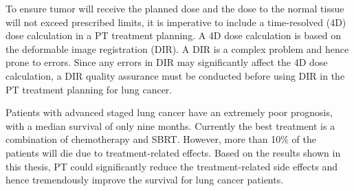 To ensure tumor will receive the planned dose and the dose to the normal tissue will not exceed prescribed limits, it is imperative
to include a time-resolved (4D) dose calculation in a PT treatment planning. A 4D dose calculation is based on the deformable image registration (DIR).
A DIR is a complex problem and hence prone to errors. Since any errors in DIR may significantly affect the 4D dose calculation, a DIR
quality assurance must be conducted before using DIR in the PT treatment planning for lung cancer.

Patients with advanced staged lung cancer have an extremely poor prognosis, with a median survival of only nine months. 
Currently the best treatment is a combination of chemotherapy and SBRT. However, more than 10\% of the patients will die due to 
treatment-related effects. Based on the results shown in this thesis, PT could significantly reduce the 
treatment-related side effects and hence tremendously improve the survival for lung cancer patients.

